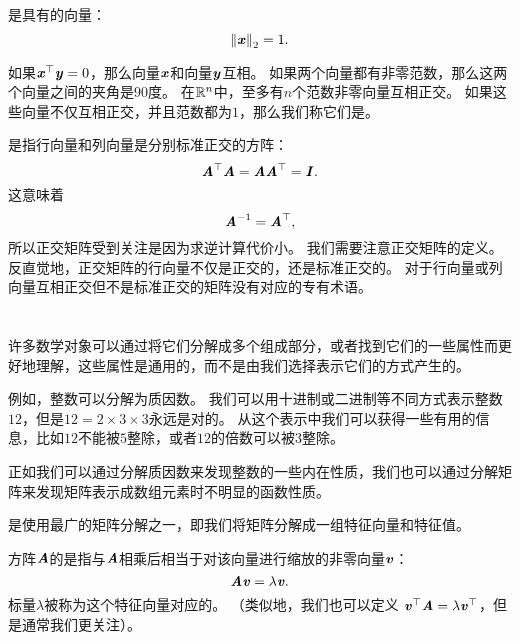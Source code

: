 是具有的向量：
\begin{equation}
\left\lVert\boldsymbol{\mathit{x}}\right\rVert_2=1.
\end{equation}


如果$\boldsymbol{\mathit{x}}^\top \boldsymbol{\mathit{y}} = 0$，那么向量$\boldsymbol{\mathit{x}}$和向量$\boldsymbol{\mathit{y}}$互相。
如果两个向量都有非零范数，那么这两个向量之间的夹角是$90$度。
在$\mathbb{R}^n$中，至多有$n$个范数非零向量互相正交。
如果这些向量不仅互相正交，并且范数都为$1$，那么我们称它们是。


是指行向量和列向量是分别标准正交的方阵：
\begin{equation}
    \boldsymbol{\mathit{A}}^\top\boldsymbol{\mathit{A}}=\boldsymbol{\mathit{A}}\boldsymbol{\mathit{A}}^\top=\boldsymbol{\mathit{I}}.
\end{equation}
这意味着 
\begin{equation}
    \boldsymbol{\mathit{A}}^{-1}=\boldsymbol{\mathit{A}}^\top,
\end{equation}
所以正交矩阵受到关注是因为求逆计算代价小。
我们需要注意正交矩阵的定义。
反直觉地，正交矩阵的行向量不仅是正交的，还是标准正交的。
对于行向量或列向量互相正交但不是标准正交的矩阵没有对应的专有术语。




\section{}
\label{sec:eigendecomposition}

许多数学对象可以通过将它们分解成多个组成部分，或者找到它们的一些属性而更好地理解，这些属性是通用的，而不是由我们选择表示它们的方式产生的。


例如，整数可以分解为质因数。
我们可以用十进制或二进制等不同方式表示整数$12$，但是$12=2\times 3\times 3$永远是对的。
从这个表示中我们可以获得一些有用的信息，比如$12$不能被$5$整除，或者$12$的倍数可以被$3$整除。


正如我们可以通过分解质因数来发现整数的一些内在性质，我们也可以通过分解矩阵来发现矩阵表示成数组元素时不明显的函数性质。


是使用最广的矩阵分解之一，即我们将矩阵分解成一组特征向量和特征值。


方阵$\boldsymbol{\mathit{A}}$的是指与$\boldsymbol{\mathit{A}}$相乘后相当于对该向量进行缩放的非零向量$\boldsymbol{\mathit{v}}$：
\begin{equation}
    \boldsymbol{\mathit{A}}\boldsymbol{\mathit{v}}=\lambda \boldsymbol{\mathit{v}}.
\end{equation}
标量$\lambda$被称为这个特征向量对应的。
（类似地，我们也可以定义 $\boldsymbol{\mathit{v}}^\top\boldsymbol{\mathit{A}}=\lambda \boldsymbol{\mathit{v}}^\top$，但是通常我们更关注）。



